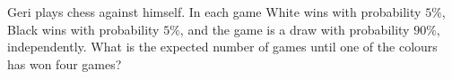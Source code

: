 Geri plays chess against himself. In each game White wins with probability $5\%$, Black wins with probability $5\%$, and the game is a draw with probability $90\%$, independently. What is the expected number of games until one of the colours has won four games?
